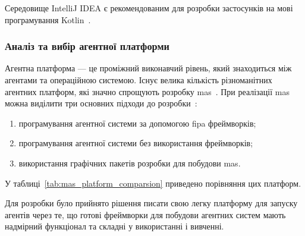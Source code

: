 Середовище IntelliJ IDEA є рекомендованим для розробки застосунків на мові програмування Kotlin~\cite{kotlin}.

\subsubsection{Аналіз та вибір агентної платформи}
Агентна платформа --- це проміжний виконавчий рівень, який знаходиться між агентами та операційною системою.
Існує велика кількість різноманітних агентних платформ, які значно спрощують розробку \acrshort{mas}~\cite{Kravari2015}.
При реалізації \acrshort{mas} можна виділити три основних підходи до розробки~\cite{Zhou2010}:
\begin{enumerate}[label={\arabic*)}]
	\item програмування агентної системи за допомогою \acrshort{fipa} фреймворків;
	\item програмування агентної системи без використання фреймворків;
	\item використання графічних пакетів розробки для побудови \acrshort{mas}.
\end{enumerate}

У таблиці~\ref{tab:mas_platform_comparsion} приведено порівняння цих платформ.

Для розробки було прийнято рішення писати свою легку платформу для запуску агентів через те, що готові фреймворки для побудови агентних систем мають надмірний функціонал та складні у використанні і вивченні.
